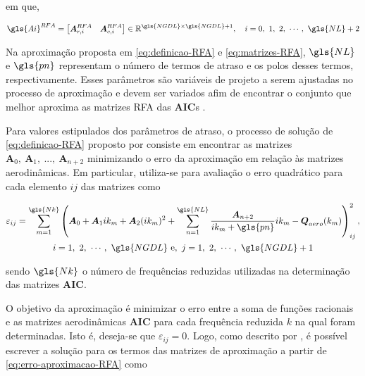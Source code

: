 \noindent em que,

\begin{equation}\label{eq:matrizes-RFA}
    \gls{Ai}^{RFA} = \begin{bmatrix}
        \boldsymbol{A}_{r,i}^{RFA} & \boldsymbol{A}_{c,i}^{RFA}
    \end{bmatrix} \in \mathbb{R}^{\gls{NGDL} \times \gls{NGDL}+1}, \quad i = 0, \ 1,\ 2,\ \cdots,\ \gls{NL}+2
\end{equation}

Na aproximação proposta em \eqref{eq:definicao-RFA} e \eqref{eq:matrizes-RFA}, $\gls{NL}$ e $\gls{pn}$ representam o número de termos de atraso e os polos desses termos, respectivamente. Esses parâmetros são variáveis de projeto a serem ajustadas no processo de aproximação e devem ser variados afim de encontrar o conjunto que melhor aproxima as matrizes \gls{RFA} das $\boldsymbol{AIC}$s \cite{book:Wright-Cooper}.

Para valores estipulados dos parâmetros de atraso, o processo de solução de \eqref{eq:definicao-RFA} proposto por \textcite{art:RogerRFA1977} consiste em encontrar as matrizes $\boldsymbol{A}_{0},\  \boldsymbol{A}_{1},\  ...,\  \boldsymbol{A}_{n+2}$ minimizando o erro da aproximação em relação às matrizes aerodinâmicas. Em particular, utiliza-se para avaliação o erro quadrático para cada elemento $ij$ das matrizes como

\begin{multline}\label{eq:erro-aproximacao-RFA}
    \varepsilon_{ij} = \sum_{m=1}^{\gls{Nk}} \left( \boldsymbol{A}_{0} + \boldsymbol{A}_{1}ik_{m} + \boldsymbol{A}_{2}(ik_{m})^2 + \sum_{n=1}^{\gls{NL}} \frac{\boldsymbol{A}_{n+2}}{ik_{m}+\gls{pn}}ik_{m} - \boldsymbol{Q}_{aero}(k_{m}) \right)_{ij} ^2 , \\ i = 1,\ 2,\ \cdots,\ \gls{NGDL} \ \text{e}, \ j = 1,\ 2,\ \cdots,\ \gls{NGDL}+1
\end{multline}

\noindent sendo $\gls{Nk}$ o número de frequências reduzidas utilizadas na determinação das matrizes $\boldsymbol{AIC}$.

O objetivo da aproximação é minimizar o erro entre a soma de funções racionais e as matrizes aerodinâmicas $\boldsymbol{AIC}$ para cada frequência reduzida $k$ na qual foram determinadas. Isto é, deseja-se que $\varepsilon_{ij} = 0$. Logo, como descrito por \textcite{book:Wright-Cooper}, é possível escrever a solução para os termos das matrizes de aproximação a partir de \eqref{eq:erro-aproximacao-RFA} como

